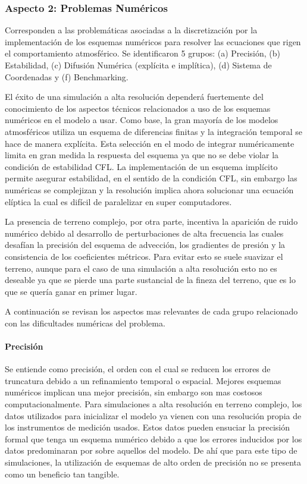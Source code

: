 \subsubsection{Aspecto 2: Problemas Numéricos}
Corresponden a las problemáticas asociadas a la discretización por la implementación de los esquemas numéricos para resolver las ecuaciones que rigen el comportamiento atmosférico. Se identificaron 5 grupos: (a) Precisión, (b) Estabilidad, (c) Difusión Numérica (explícita e implítica), (d) Sistema de Coordenadas y (f) Benchmarking.

El éxito de una simulación a alta resolución dependerá fuertemente del conocimiento de los aspectos técnicos relacionados a uso de los esquemas numéricos en el modelo a usar. Como base, la gran mayoría de los modelos atmosféricos utiliza un esquema de diferencias finitas y la integración temporal se hace de manera explícita. Esta selección en el modo de integrar numéricamente limita en gran medida la respuesta del esquema ya que no se debe violar la condición de estabilidad CFL. La implementación de un esquema implícito permite asegurar estabilidad, en el sentido de la condición CFL, sin embargo las numéricas se complejizan y la resolución implica ahora solucionar una ecuación elíptica la cual es difícil de paralelizar en super computadores.

La presencia de terreno complejo, por otra parte, incentiva la aparición de ruido numérico debido al desarrollo de perturbaciones de alta frecuencia las cuales desafían la precisión del esquema de advección, los gradientes de presión y la consistencia de los coeficientes métricos. Para evitar esto se suele suavizar el terreno, aunque para el caso de una simulación a alta resolución esto no es deseable ya que se pierde una parte sustancial de la fineza del terreno, que es lo que se quería ganar en primer lugar. 

A continuación se revisan los aspectos mas relevantes de cada grupo relacionado con las dificultades numéricas del problema.

\paragraph{Precisión} Se entiende como precisión, el orden con el cual se reducen los errores de truncatura debido a un refinamiento temporal o espacial. Mejores esquemas numéricos implican una mejor precisión, sin embargo son mas costosos computacionalmente. Para simulaciones a alta resolución en terreno complejo, los datos utilizados para inicializar el modelo ya vienen con una resolución propia de los instrumentos de medición usados. Estos datos pueden ensuciar la precisión formal que tenga un esquema numérico debido a que los errores inducidos por los datos predominaran por sobre aquellos del modelo. De ahí que para este tipo de simulaciones, la utilización de esquemas de alto orden de precisión no se presenta como un beneficio tan tangible.


